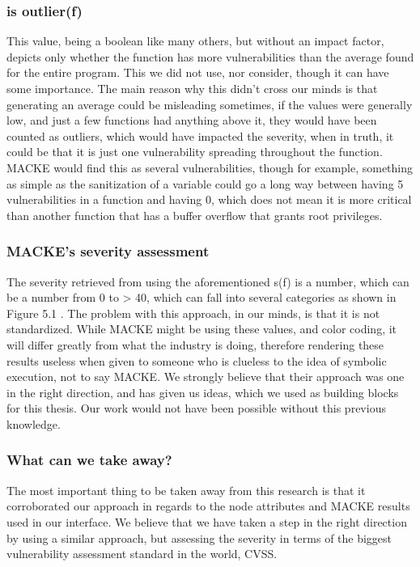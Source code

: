 \subsubsection{is outlier(f)}

This value, being a boolean like many others, but without an impact factor, depicts only whether the function has more vulnerabilities than the average found for the entire program. This we did not use, nor consider, though it can have some importance. The main reason why this didn't cross our minds is that generating an average could be misleading sometimes, if the values were generally low, and just a few functions had anything above it, they would have been counted as outliers, which would have impacted the severity, when in truth, it could be that it is just one vulnerability spreading throughout the function. MACKE would find this as several vulnerabilities, though for example, something as simple as the sanitization of a variable could go a long way between having 5 vulnerabilities in a function and having 0, which does not mean it is more critical than another function that has a buffer overflow that grants root privileges.

\subsubsection{MACKE's severity assessment}

The severity retrieved from using the aforementioned s(f) is a number, which can be a number from 0 to > 40, which can fall into several categories as shown in Figure 5.1 \parencite{ognawala}. The problem with this approach, in our minds, is that it is not standardized. While MACKE might be using these values, and color coding, it will differ greatly from what the industry is doing, therefore rendering these results useless when given to someone who is clueless to the idea of symbolic execution, not to say MACKE. We strongly believe that their approach was one in the right direction, and has given us ideas, which we used as building blocks for this thesis. Our work would not have been possible without this previous knowledge.

\subsubsection{What can we take away?}

The most important thing to be taken away from this research is that it corroborated our approach in regards to the node attributes and MACKE results used in our interface. We believe that we have taken a step in the right direction by using a similar approach, but assessing the severity in terms of the biggest vulnerability assessment standard in the world, CVSS\parencite{cvss3}.

